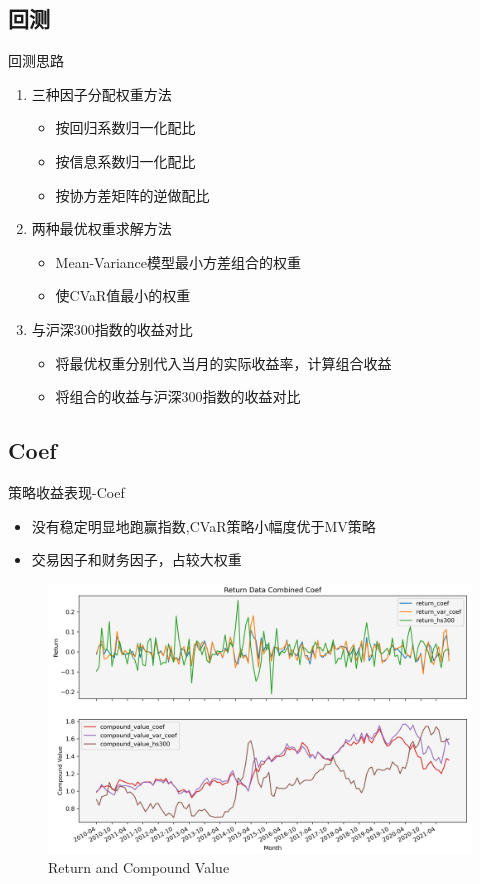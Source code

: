 \documentclass[CJK,aspectratio=43]{beamer}  %
\begin{document}
\subsection{回测}
\begin{frame}{回测思路}
	\begin{enumerate}
		\item 三种因子分配权重方法
		\begin{itemize}
			\item 按回归系数归一化配比
			\item 按信息系数归一化配比
			\item 按协方差矩阵的逆做配比
		\end{itemize}
		\item 两种最优权重求解方法
		\begin{itemize}
			\item Mean-Variance模型最小方差组合的权重
			\item 使CVaR值最小的权重
		\end{itemize}
		\item 与沪深300指数的收益对比
		\begin{itemize}
			\item 将最优权重分别代入当月的实际收益率，计算组合收益
			\item 将组合的收益与沪深300指数的收益对比
		\end{itemize}
	\end{enumerate}
\end{frame}

\subsection{Coef}
\begin{frame}{策略收益表现-Coef}
	\begin{itemize}
		\item 没有稳定明显地跑赢指数,CVaR策略小幅度优于MV策略
		\item 交易因子和财务因子，占较大权重
	\end{itemize}
	\begin{figure}
		\centering
		\includegraphics[width=0.85\linewidth]{pic/Coef}
		\caption{Return and Compound Value}
		\label{fig:coef}
	\end{figure}
\end{frame}
\end{document}
